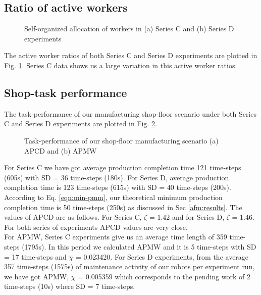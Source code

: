 \subsection*{Ratio of active workers}
\begin{figure}
\centering
{}
\caption{\small Self-organized allocation of workers in (a) Series C and (b) Series D experiments}
\label{fig:plasticity-SC-SD} 
\end{figure}
%
The active worker ratios of both Series C and Series D experiments are plotted in Fig. \ref{fig:plasticity-SC-SD}. Series C data shows us a large variation in this active worker ratios.
\subsection*{Shop-task performance}
The task-performance of our manufacturing shop-floor scenario under both Series C and Series D experiments are plotted in Fig. \ref{fig:vms-SC-SD}. 
\begin{figure}
\centering
{}
\caption{\small Task-performance of our shop-floor manufacturing scenario (a) APCD and (b) APMW}
\label{fig:vms-SC-SD} 
\end{figure}
For Series C we have got average production completion time 121 time-steps (605s) with SD = 36 time-steps (180s). For Series D,  average production completion time is 123 time-steps (615s) with SD = 40 time-steps (200s). According to Eq. \ref{eqn:min-pmm}, our theoretical minimum production completion time is 50 time-steps (250s) as discussed in Sec \ref{afm:results}.  The values of APCD are as follows. For Series C, $\zeta$ = 1.42 and for Series D, $\zeta$ = 1.46. For both series of experiments APCD values are very close.\\
For APMW, Series C experiments give us an average time length of 359 time-steps (1795s). In this period we calculated APMW and it is 5 time-steps with SD = 17 time-steps and $\chi$ = 0.023420. For Series D experiments, from the average 357 time-steps (1575s) of maintenance activity of our robots per experiment run, we have got APMW, $\chi$ = 0.005359 which corresponds to the pending work of 2 time-steps (10s) where SD = 7 time-steps.\\
